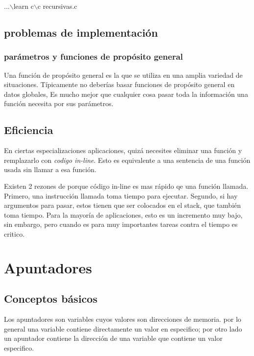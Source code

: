 \documentclass[]{article}
\begin{document}
	...$\backslash$learn c$\backslash$c recursivas.c
	
	\subsection{problemas de implementación}
	
	\subsubsection{parámetros y funciones de propósito general}
	
	Una función de propósito general es la que se utiliza en una amplia variedad de situaciones. Típicamente no deberías basar funciones de propósito general en datos globales, Es mucho mejor que cualquier cosa pasar toda la información una función necesita por sus parámetros.\\
	
	\subsection{Eficiencia}
	
	En ciertas especializaciones aplicaciones, quizá necesites eliminar una función y remplazarlo con \textit{codigo in-line}. Esto es equivalente a una sentencia de una función usada sin llamar a esa función.
	
	Existen 2 rezones de porque código in-line es mas rápido qe una función llamada. Primero, una instrucción llamada toma tiempo para ejecutar. Segundo, si hay argumentos para pasar, estos tienen que ser colocados en el stack, que también toma tiempo. Para la mayoría de aplicaciones, esto es un incremento muy bajo, sin embargo, pero cuando es para muy importantes tareas contra el tiempo es critico.
	
	\section{Apuntadores}
	
	\subsection{Conceptos básicos}
	Los apuntadores son variables cuyos valores son direcciones de memoria. por lo general una variable contiene directamente un valor en especifico; por otro lado un apuntador contiene la dirección de una variable que contiene un valor especifico.\\
	
\end{document}
